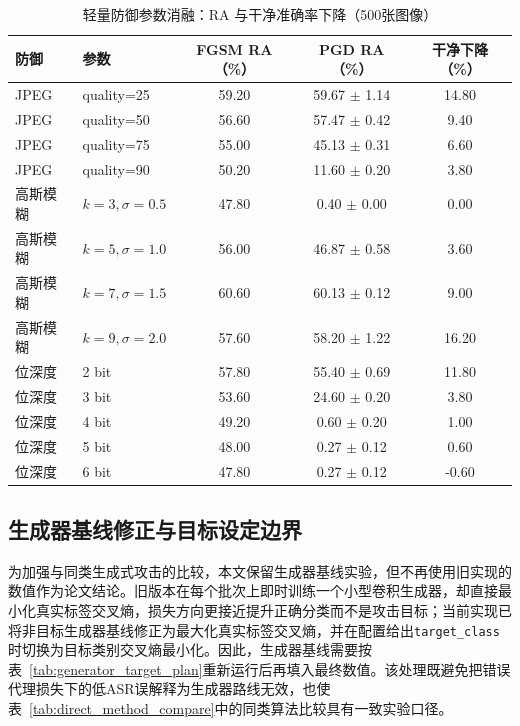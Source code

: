 \documentclass[type=bachelor,oneside]{fduthesis}
\newcommand{\tablefont}{\small}
\begin{document}
\begin{table}[htbp]
  \centering
  \caption{轻量防御参数消融：RA 与干净准确率下降（500张图像）}
  \label{tab:light_defense_ablation}
  \tablefont
  \setlength{\tabcolsep}{3pt}
  \renewcommand{\arraystretch}{1.12}
  \begin{tabular}{llccc}
    \toprule
    防御 & 参数 & FGSM RA（\%） & PGD RA（\%） & 干净下降（\%） \\
    \midrule
    JPEG & quality=25 & 59.20 & 59.67 $\pm$ 1.14 & 14.80 \\
    JPEG & quality=50 & 56.60 & 57.47 $\pm$ 0.42 & 9.40 \\
    JPEG & quality=75 & 55.00 & 45.13 $\pm$ 0.31 & 6.60 \\
    JPEG & quality=90 & 50.20 & 11.60 $\pm$ 0.20 & 3.80 \\
    \midrule
    高斯模糊 & $k=3,\sigma=0.5$ & 47.80 & 0.40 $\pm$ 0.00 & 0.00 \\
    高斯模糊 & $k=5,\sigma=1.0$ & 56.00 & 46.87 $\pm$ 0.58 & 3.60 \\
    高斯模糊 & $k=7,\sigma=1.5$ & 60.60 & 60.13 $\pm$ 0.12 & 9.00 \\
    高斯模糊 & $k=9,\sigma=2.0$ & 57.60 & 58.20 $\pm$ 1.22 & 16.20 \\
    \midrule
    位深度 & 2 bit & 57.80 & 55.40 $\pm$ 0.69 & 11.80 \\
    位深度 & 3 bit & 53.60 & 24.60 $\pm$ 0.20 & 3.80 \\
    位深度 & 4 bit & 49.20 & 0.60 $\pm$ 0.20 & 1.00 \\
    位深度 & 5 bit & 48.00 & 0.27 $\pm$ 0.12 & 0.60 \\
    位深度 & 6 bit & 47.80 & 0.27 $\pm$ 0.12 & -0.60 \\
    \bottomrule
  \end{tabular}
\end{table}

\subsection{生成器基线修正与目标设定边界}

为加强与同类生成式攻击的比较，本文保留生成器基线实验，但不再使用旧实现的数值作为论文结论。旧版本在每个批次上即时训练一个小型卷积生成器，却直接最小化真实标签交叉熵，损失方向更接近提升正确分类而不是攻击目标；当前实现已将非目标生成器基线修正为最大化真实标签交叉熵，并在配置给出\texttt{target\_class}时切换为目标类别交叉熵最小化。因此，生成器基线需要按表~\ref{tab:generator_target_plan}重新运行后再填入最终数值。该处理既避免把错误代理损失下的低ASR误解释为生成器路线无效，也使表~\ref{tab:direct_method_compare}中的同类算法比较具有一致实验口径。
\end{document}
